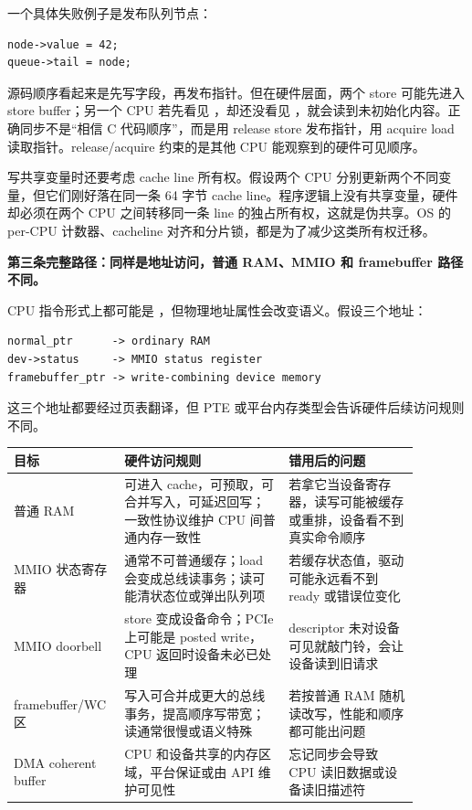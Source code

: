 一个具体失败例子是发布队列节点：

\begin{lstlisting}
node->value = 42;
queue->tail = node;
\end{lstlisting}

源码顺序看起来是先写字段，再发布指针。但在硬件层面，两个 store 可能先进入 store buffer；另一个 CPU 若先看见 ，却还没看见 ，就会读到未初始化内容。正确同步不是“相信 C 代码顺序”，而是用 release store 发布指针，用 acquire load 读取指针。release/acquire 约束的是其他 CPU 能观察到的硬件可见顺序。

写共享变量时还要考虑 cache line 所有权。假设两个 CPU 分别更新两个不同变量，但它们刚好落在同一条 64 字节 cache line。程序逻辑上没有共享变量，硬件却必须在两个 CPU 之间转移同一条 line 的独占所有权，这就是伪共享。OS 的 per-CPU 计数器、cacheline 对齐和分片锁，都是为了减少这类所有权迁移。

\medskip
\noindent\textbf{第三条完整路径：同样是地址访问，普通 RAM、MMIO 和 framebuffer 路径不同。}

CPU 指令形式上都可能是 ，但物理地址属性会改变语义。假设三个地址：

\begin{lstlisting}
normal_ptr      -> ordinary RAM
dev->status     -> MMIO status register
framebuffer_ptr -> write-combining device memory
\end{lstlisting}

这三个地址都要经过页表翻译，但 PTE 或平台内存类型会告诉硬件后续访问规则不同。

\begin{longtable}{p{0.2\linewidth}p{0.38\linewidth}p{0.3\linewidth}}
\toprule
目标 & 硬件访问规则 & 错用后的问题 \\
\midrule
普通 RAM & 可进入 cache，可预取，可合并写入，可延迟回写；一致性协议维护 CPU 间普通内存一致性 & 若拿它当设备寄存器，读写可能被缓存或重排，设备看不到真实命令顺序 \\
MMIO 状态寄存器 & 通常不可普通缓存；load 会变成总线读事务；读可能清状态位或弹出队列项 & 若缓存状态值，驱动可能永远看不到 ready 或错误位变化 \\
MMIO doorbell & store 变成设备命令；PCIe 上可能是 posted write，CPU 返回时设备未必已处理 & descriptor 未对设备可见就敲门铃，会让设备读到旧请求 \\
framebuffer/WC 区 & 写入可合并成更大的总线事务，提高顺序写带宽；读通常很慢或语义特殊 & 若按普通 RAM 随机读改写，性能和顺序都可能出问题 \\
DMA coherent buffer & CPU 和设备共享的内存区域，平台保证或由 API 维护可见性 & 忘记同步会导致 CPU 读旧数据或设备读旧描述符 \\
\bottomrule
\end{longtable}

